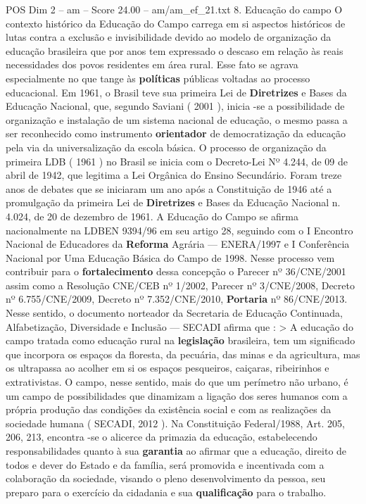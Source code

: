 \begin{textsample}{POS Dim 2 – am – Score 24.00 – am/am\_ef\_21.txt}  \label{ex:f2_pos_154}
8.
Educação do campo O contexto histórico da Educação do Campo carrega em si aspectos históricos de lutas contra a exclusão e invisibilidade devido ao modelo de organização da educação brasileira que por anos tem expressado o descaso em relação às reais necessidades dos povos residentes em área rural.
Esse fato se agrava especialmente no que tange às \textbf{políticas} públicas voltadas ao processo educacional.
Em 1961, o Brasil teve sua primeira Lei de \textbf{Diretrizes} e Bases da Educação Nacional, que, segundo Saviani ( 2001 ), inicia -se a possibilidade de organização e instalação de um sistema nacional de educação, o mesmo passa a ser reconhecido como instrumento \textbf{orientador} de democratização da educação pela via da universalização da escola básica.
O processo de organização da primeira LDB ( 1961 ) no Brasil se inicia com o Decreto-Lei Nº 4.244, de 09 de abril de 1942, que legitima a Lei Orgânica do Ensino Secundário.
Foram treze anos de debates que se iniciaram um ano após a Constituição de 1946 até a promulgação da primeira Lei de \textbf{Diretrizes} e Bases da Educação Nacional n. 4.024, de 20 de dezembro de 1961.
A Educação do Campo se afirma nacionalmente na LDBEN 9394/96 em seu artigo 28, seguindo com o I Encontro Nacional de Educadores da \textbf{Reforma} Agrária — ENERA/1997 e I Conferência Nacional por Uma Educação Básica do Campo de 1998.
Nesse processo vem contribuir para o \textbf{fortalecimento} dessa concepção o Parecer nº 36/CNE/2001 assim como a Resolução CNE/CEB nº 1/2002, Parecer nº 3/CNE/2008, Decreto nº 6.755/CNE/2009, Decreto nº 7.352/CNE/2010, \textbf{Portaria} nº 86/CNE/2013.
Nesse sentido, o documento norteador da Secretaria de Educação Continuada, Alfabetização, Diversidade e Inclusão — SECADI afirma que : > A educação do campo tratada como educação rural na \textbf{legislação} brasileira, tem um significado que incorpora os espaços da floresta, da pecuária, das minas e da agricultura, mas os ultrapassa ao acolher em si os espaços pesqueiros, caiçaras, ribeirinhos e extrativistas.
O campo, nesse sentido, mais do que um perímetro não urbano, é um campo de possibilidades que dinamizam a ligação dos seres humanos com a própria produção das condições da existência social e com as realizações da sociedade humana ( SECADI, 2012 ).
Na Constituição Federal/1988, Art. 205, 206, 213, encontra -se o alicerce da primazia da educação, estabelecendo responsabilidades quanto à sua \textbf{garantia} ao afirmar que a educação, direito de todos e dever do Estado e da família, será promovida e incentivada com a colaboração da sociedade, visando o pleno desenvolvimento da pessoa, seu preparo para o exercício da cidadania e sua \textbf{qualificação} para o trabalho.

\end{textsample}
